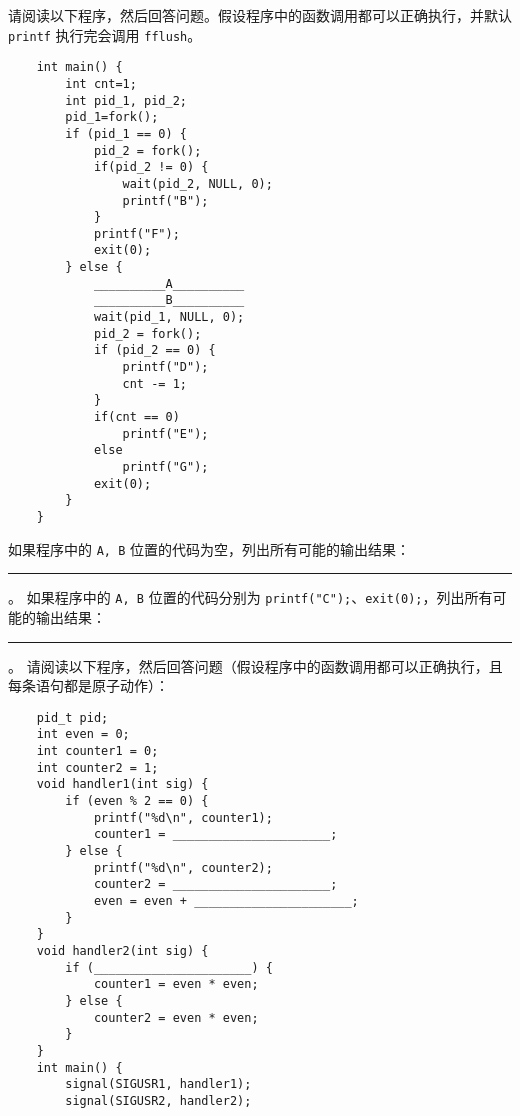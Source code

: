 \begin{problems}
         请阅读以下程序，然后回答问题。假设程序中的函数调用都可以正确执行，并默认 \verb|printf| 执行完会调用 \verb|fflush|。
        \begin{verbatim}
    int main() {
        int cnt=1;
        int pid_1, pid_2;
        pid_1=fork();
        if (pid_1 == 0) {
            pid_2 = fork();
            if(pid_2 != 0) {
                wait(pid_2, NULL, 0);
                printf("B");
            }
            printf("F");
            exit(0);
        } else {
            __________A__________
            __________B__________
            wait(pid_1, NULL, 0);
            pid_2 = fork();
            if (pid_2 == 0) {
                printf("D");
                cnt -= 1;
            }
            if(cnt == 0)
                printf("E");
            else
                printf("G");
            exit(0);
        }
    }
        \end{verbatim}
        \qn 如果程序中的 \verb|A, B| 位置的代码为空，列出所有可能的输出结果：\rule{3cm}{0.25mm}。
        \qn 如果程序中的 \verb|A, B| 位置的代码分别为 \verb|printf("C");|、\verb|exit(0);|，列出所有可能的输出结果：\rule{6cm}{0.25mm}。
         请阅读以下程序，然后回答问题（假设程序中的函数调用都可以正确执行，且每条语句都是原子动作）：
        \begin{verbatim}
    pid_t pid;
    int even = 0;
    int counter1 = 0;
    int counter2 = 1;
    void handler1(int sig) {
        if (even % 2 == 0) {
            printf("%d\n", counter1);
            counter1 = ______________________;
        } else {
            printf("%d\n", counter2);
            counter2 = ______________________;
            even = even + ______________________;
        }
    }
    void handler2(int sig) {
        if (______________________) {
            counter1 = even * even;
        } else {
            counter2 = even * even;
        }
    }
    int main() {
        signal(SIGUSR1, handler1);
        signal(SIGUSR2, handler2);


\end{verbatim}
\end{problems}
